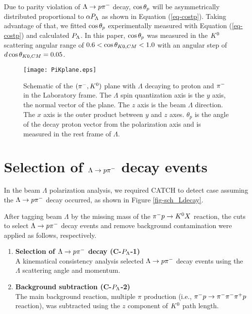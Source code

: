 Due to parity violation of $\Lambda\to p\pi^{-}$ decay, $\cos{\theta_p}$ will be asymmetrically distributed proportional to $\alpha P_{\Lambda}$ \cite{Lee1957} as shown in Equation (\ref{eq-costp}). Taking advantage of that, we fitted $\cos{\theta_p}$ experimentally measured with Equation (\ref{eq-costp}) and calculated $P_{\Lambda}$. In this paper, $\cos{\theta_p}$ was measured in the $K^{0}$ scattering angular range of $0.6<\cos{\theta_{K0,CM}}<1.0$ with an angular step of $d\cos{\theta_{K0,CM}} = 0.05$.


\begin{figure}[h]
  \centering
  \texttt{[image: PiKplane.eps]}
  \caption{Schematic of the $(\pi^-,K^0)$ plane with $\Lambda$ decaying to proton and $\pi^{-}$ in the Laboratory frame. The $\Lambda$ spin quantization axis is the $y$ axis, the normal vector of the plane. The $z$ axis is the beam $\Lambda$ direction. The $x$ axis is the outer product between $y$ and $z$ axes. $\theta_p$ is the angle of the decay proton vector from the polarization axis and is measured in the rest frame of $\Lambda$.}
  \label{fig-PiKplane}
\end{figure}


\clearpage
\section{Selection of $\Lambda\to p\pi^{-}$ decay events}
\label{sec-Pl-evsele}

In the beam $\Lambda$ polarization analysis, we required CATCH to detect case  assuming the $\Lambda\to p\pi^{-}$ decay occurred, as shown in Figure \ref{fig-sch_Ldecay}.  %

After tagging beam $\Lambda$ by the missing mass of the $\pi^- p \to K^0 X$ reaction, the cuts to select $\Lambda\to p\pi^{-}$ decay events and remove background contamination were applied as follows, respectively. 


\begin{enumerate}
  \item {\bf Selection of $\Lambda\to p\pi^{-}$ decay ({\bf C-$P_{\Lambda}$-1}) } \\
  A kinematical consistency analysis selected $\Lambda\to p\pi^{-}$ decay events using the $\Lambda$ scattering angle and momentum.
  \item {\bf Background subtraction ({\bf C-$P_{\Lambda}$-2}) } \\
  The main background reaction, multiple $\pi$ production (i.e., $\pi^- p \to \pi^-\pi^-\pi^+p$ reaction), was subtracted using the $z$ component of $K^{0}$ path length. 
\end{enumerate}

